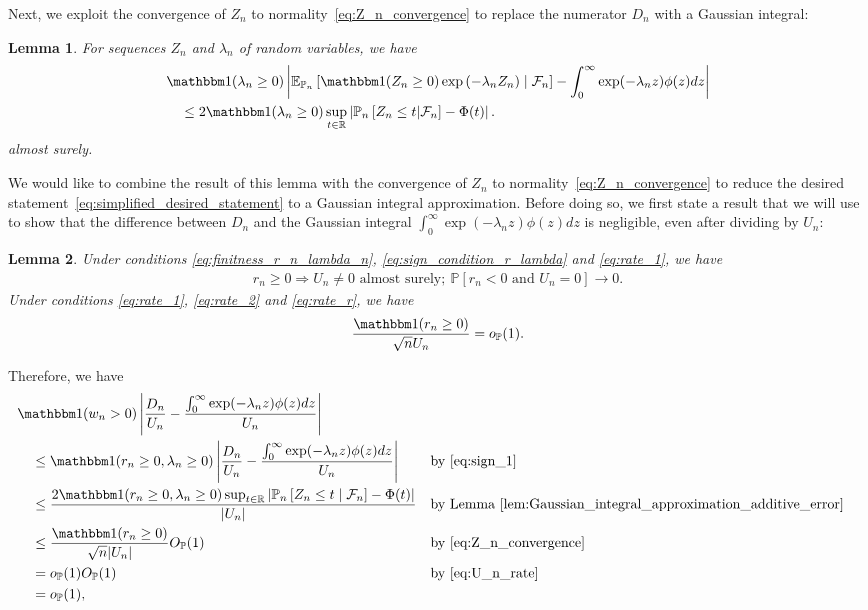 \documentclass[12pt]{article}
\newtheorem{lemma}{Lemma}
\theoremstyle{definition}
\def\P{\mathbb{P}}
\def\P{\mathbb{P}}
\newcommand{\E}{\mathbb E}								%
\renewcommand{\P}{\mathbb{P}}							%
\newcommand{\indicator}{\mathbbm 1}						%
\begin{document}
Next, we exploit the convergence of $Z_n$ to normality~\eqref{eq:Z_n_convergence} to replace the numerator $D_n$ with a Gaussian integral:
\begin{lemma}\label{lem:Gaussian_integral_approximation_additive_error}
	For sequences $Z_n$ and $\lambda_n$ of random variables, we have
	\begin{equation}\label{eq:additive_bound_Gaussian_integral}
	\begin{split}
		&\indicator(\lambda_n \geq 0)\left|\E_{\P_n}\left[\indicator(Z_n \geq 0)\exp\left(- \lambda_n Z_n \right) \mid \mathcal{F}_n\right] - \int_0^\infty \exp(-\lambda_n z)\phi(z)dz\right|\\
		&\quad \leq 2\indicator(\lambda_n \geq 0)\sup_{t\in\mathbb{R}}\left|\P_n\left[Z_n\leq t|\mathcal{F}_n \right]-\Phi(t)\right|.
	\end{split}
	\end{equation}
	almost surely.
\end{lemma}
\noindent We would like to combine the result of this lemma with the convergence of $Z_n$ to normality~\eqref{eq:Z_n_convergence} to reduce the desired statement~\eqref{eq:simplified_desired_statement} to a Gaussian integral approximation. Before doing so, we first state a result that we will use to show that the difference between $D_n$ and the Gaussian integral $\int_0^\infty \exp(-\lambda_n z)\phi(z)dz$ is negligible, even after dividing by $U_n$:
\begin{lemma}\label{lem:relative_error_Berry_Esseen_bound}
Under conditions \eqref{eq:finitness_r_n_lambda_n}, \eqref{eq:sign_condition_r_lambda} and \eqref{eq:rate_1}, we have 
\begin{align}
r_n\geq 0 \Rightarrow U_n \neq 0 \text{ almost surely};\ \P[r_n<0\text{ and }U_n=0]\rightarrow0. \label{eq:U_n_r_n}
\end{align}
Under conditions \eqref{eq:rate_1}, \eqref{eq:rate_2} and \eqref{eq:rate_r}, we have
\begin{align}
	\frac{\indicator(r_n\geq 0)}{\sqrt{n}U_n} =o_{\P}(1). \label{eq:U_n_rate}
\end{align}
\end{lemma}
\noindent Therefore, we have
\begin{align*}
&\indicator(w_n > 0) \left|\frac{D_n}{U_n} - \frac{\int_0^\infty \exp(-\lambda_n z)\phi(z)dz}{U_n}\right| \\
&\quad \leq \indicator(r_n \geq 0, \lambda_n \geq 0) \left|\frac{D_n}{U_n} - \frac{\int_0^\infty \exp(-\lambda_n z)\phi(z)dz}{U_n}\right| && \text{by}~\eqref{eq:sign_1} \\
&\quad\leq \frac{2\indicator(r_n \geq 0, \lambda_n \geq 0) \sup_{t\in\mathbb{R}}\left|\P_n\left[Z_n \leq t \mid \mathcal F_n\right] - \Phi(t)\right|}{|U_n|} && \text{by Lemma}~\ref{lem:Gaussian_integral_approximation_additive_error} \\
&\quad\leq \frac{\indicator(r_n \geq 0)}{\sqrt{n}|U_n|}O_{\P}(1) && \text{by}~\eqref{eq:Z_n_convergence} \\
&\quad= o_{\P}(1)O_{\P}(1) && \text{by}~\eqref{eq:U_n_rate}\\
&\quad= o_{\P}(1),
\end{align*}
\end{document}
